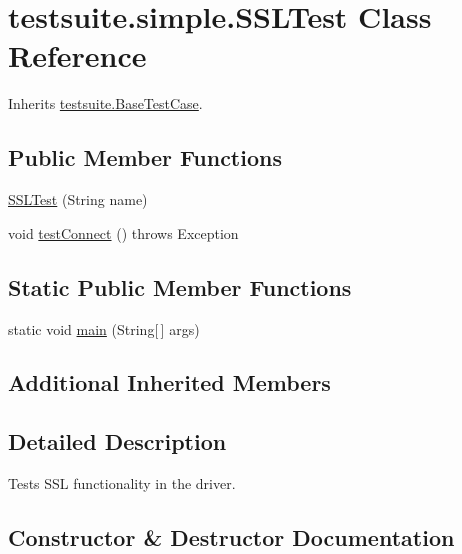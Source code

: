 \hypertarget{classtestsuite_1_1simple_1_1_s_s_l_test}{}\section{testsuite.\+simple.\+S\+S\+L\+Test Class Reference}
\label{classtestsuite_1_1simple_1_1_s_s_l_test}


Inherits \mbox{\hyperlink{classtestsuite_1_1_base_test_case}{testsuite.\+Base\+Test\+Case}}.

\subsection*{Public Member Functions}
\begin{DoxyCompactItemize}
\item 
\mbox{\hyperlink{classtestsuite_1_1simple_1_1_s_s_l_test_abdad6d8bc69a88f4a2f2f028f90cf287}{S\+S\+L\+Test}} (String name)
\item 
void \mbox{\hyperlink{classtestsuite_1_1simple_1_1_s_s_l_test_ad9e62b989cd5424f9ca3995f9bea794a}{test\+Connect}} ()  throws Exception 
\end{DoxyCompactItemize}
\subsection*{Static Public Member Functions}
\begin{DoxyCompactItemize}
\item 
static void \mbox{\hyperlink{classtestsuite_1_1simple_1_1_s_s_l_test_a0435dcfc4b0a69d7653db1f50647ce9f}{main}} (String\mbox{[}$\,$\mbox{]} args)
\end{DoxyCompactItemize}
\subsection*{Additional Inherited Members}


\subsection{Detailed Description}
Tests S\+SL functionality in the driver. 

\subsection{Constructor \& Destructor Documentation}
\mbox{\label{classtestsuite_1_1simple_1_1_s_s_l_test_abdad6d8bc69a88f4a2f2f028f90cf287}} 
